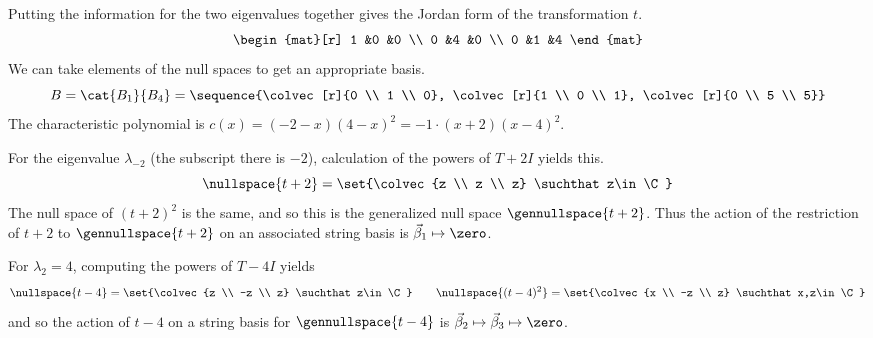 \begin{exercises}
\begin{answer}
\begin{exparts}
            Putting the information for the two eigenvalues 
            together gives the Jordan form of the transformation $t$.
            \begin{equation*}
              \begin{mat}[r]
                1  &0  &0  \\
                0  &4  &0  \\
                0  &1  &4
              \end{mat}
            \end{equation*}
            We can take elements of the null spaces to get an appropriate
            basis.
            \begin{equation*}
              B=\cat{B_{1}}{B_4}=
               \sequence{\colvec[r]{0 \\ 1 \\ 0},
                          \colvec[r]{1 \\ 0 \\ 1},
                          \colvec[r]{0 \\ 5 \\ 5}}
            \end{equation*}
        \partsitem The characteristic polynomial is 
            \( c(x)=(-2-x)(4-x)^2=-1\cdot (x+2)(x-4)^2 \).

            For the eigenvalue $\lambda_{-2}$
            (the subscript there is \( -2\)), calculation of the
            powers of $T+2I$ yields this.
            \begin{equation*}
              \nullspace{t+2}=\set{\colvec{z \\ z \\ z}
                                      \suchthat z\in\C}
            \end{equation*}
            The null space of $(t+2)^2$ is the same, and so 
            this is the generalized null space $\gennullspace{t+2}$.
            Thus the action of the restriction of $t+2$ to 
            $\gennullspace{t+2}$ on an associated
            string basis is $\vec{\beta}_1\mapsto\zero$.

            For $\lambda_2=4$, 
            computing the powers of $T-4I$ yields 
            \begin{equation*}
              \nullspace{t-4}=\set{\colvec{z \\ -z \\ z}
                                      \suchthat z\in\C} 
              \qquad
              \nullspace{(t-4)^2}=\set{\colvec{x \\ -z \\ z}
                                           \suchthat x,z\in\C}
            \end{equation*}
            and so the action of $t-4$ on a string basis for 
            $\gennullspace{t-4}$ is
            $\vec{\beta}_2\mapsto\vec{\beta}_3\mapsto\zero$.


\end{exparts}
\end{answer}
\end{exercises}
